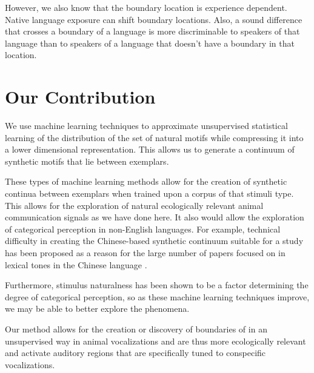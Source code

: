 However, we also know that the boundary location is experience dependent. Native language exposure can shift boundary locations. Also, a sound difference that crosses a boundary of a language is more discriminable to speakers of that language than to speakers of a language that doesn’t have a boundary in that location.


\section{Our Contribution}
We use machine learning techniques to approximate unsupervised statistical learning of the distribution of the set of natural motifs while compressing it into a lower dimensional representation. This allows us to generate a continuum of synthetic motifs that lie between exemplars.

These types of machine learning methods allow for the creation of synthetic continua between exemplars when trained upon a corpus of that stimuli type. This allows for the exploration of natural ecologically relevant animal communication signals as we have done here. It also would allow the exploration of categorical perception in non-English languages. For example, technical difficulty in creating the Chinese-based synthetic continuum suitable for a \CP study has been proposed as a reason for the large number of papers focused on \CP in lexical tones in the Chinese language \cite{zhang2013categorical}.

Furthermore, stimulus naturalness has been shown to be a factor determining the degree of categorical perception\cite{van1999categorical}, so as these machine learning techniques improve, we may be able to better explore the \CP phenomena.

Our method allows for the creation or discovery of boundaries of \CP in an unsupervised way in animal vocalizations and are thus more ecologically relevant and activate auditory regions that are specifically tuned to conspecific vocalizations.